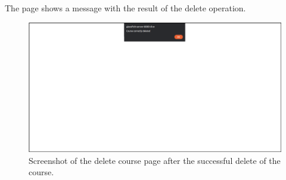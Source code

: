 The page shows a message with the result of the delete operation.

\begin{figure}[H]
    \centering
     \includegraphics[width=1\textwidth]{img/user_manual/professor/delete-course-alert.png}
    \caption{\label{fig:professor-delete-course-3} Screenshot of the delete course page after the successful delete of the course.}
\end{figure}